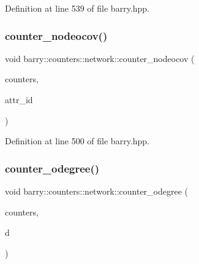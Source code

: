 Definition at line 539 of file barry.\+hpp.

\mbox{\label{namespacebarry_1_1counters_1_1network_a2804cd2dba633fdccc7a1ca6a15bdf47}} 
\subsubsection{\texorpdfstring{counter\+\_\+nodeocov()}{counter\_nodeocov()}}
{\footnotesize\ttfamily void barry\+::counters\+::network\+::counter\+\_\+nodeocov (\begin{DoxyParamCaption}\item[{\hyperlink{namespacebarry_1_1counters_1_1network_a3b3c590303d47840d1967372ae495d95}{Net\+Counter\+Vector} $\ast$}]{counters,  }\item[{\hyperlink{namespacebarry_a11dfc53ddb4672278319aa04f1e09a6c}{uint}}]{attr\+\_\+id }\end{DoxyParamCaption})\hspace{0.3cm}{\ttfamily [inline]}}



Definition at line 500 of file barry.\+hpp.

\mbox{\label{namespacebarry_1_1counters_1_1network_af679a51acdd35805c7c40748af65c0f4}} 
\subsubsection{\texorpdfstring{counter\+\_\+odegree()}{counter\_odegree()}}
{\footnotesize\ttfamily void barry\+::counters\+::network\+::counter\+\_\+odegree (\begin{DoxyParamCaption}\item[{\hyperlink{namespacebarry_1_1counters_1_1network_a3b3c590303d47840d1967372ae495d95}{Net\+Counter\+Vector} $\ast$}]{counters,  }\item[{std\+::vector$<$ \hyperlink{namespacebarry_a11dfc53ddb4672278319aa04f1e09a6c}{uint} $>$}]{d }\end{DoxyParamCaption})\hspace{0.3cm}{\ttfamily [inline]}}



